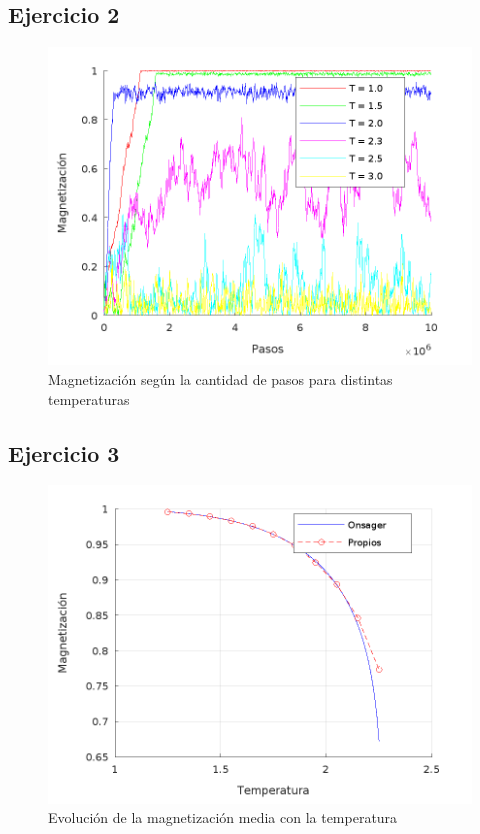 \documentclass[a4paper,12pt,spanish]{article}
\begin{document}
	
	
	
	\subsection{Ejercicio 2}
	
	
	
	\begin{figure}[H]
		\centering
		\includegraphics[width=0.7\linewidth]{../obtencion_resultados/grafica_ej2}
		\caption{Magnetización según la cantidad de pasos para distintas temperaturas}
		\label{fig:graficaej2}
	\end{figure}
	
	
	
	
	\subsection{Ejercicio 3}
	
	
	\begin{figure}[H]
		\centering
		\includegraphics[width=0.7\linewidth]{../obtencion_resultados/grafica_ej3}
		\caption{Evolución de la magnetización media con la temperatura}
		\label{fig:graficaej3}
	\end{figure}
	
\end{document}
